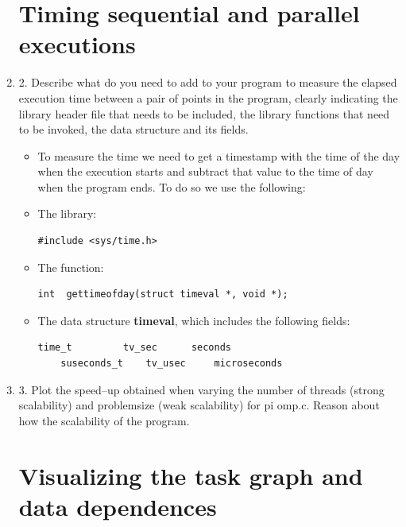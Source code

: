 \documentclass[12pt]{article}
\begin{document}
\begin{enumerate}
\section*{Timing sequential and parallel executions}

\item[] 2. Describe what do you need to add to your program to measure the elapsed execution time between a pair of points in the program, clearly indicating the library header file that needs to be included, the library functions that need to be invoked, the data structure and its fields.


\begin{itemize}

\item[] To measure the time we need to get a timestamp with the time of the day when the execution starts and subtract that value to the time of day when the program ends. To do so we use the following:

\item The library:
\begin{lstlisting}[style=CStyle]
	#include <sys/time.h>
\end{lstlisting}

\item The function:
\begin{lstlisting}[style=CStyle]
	int  gettimeofday(struct timeval *, void *);
\end{lstlisting}

\item The data structure \textbf{timeval}, which includes the following fields:

\begin{lstlisting}[style=CStyle]
	time_t         tv_sec      seconds
	suseconds_t    tv_usec     microseconds
\end{lstlisting}





\end{itemize}




\item[] 3. Plot the speed–up obtained when varying the number of threads (strong scalability) and problemsize (weak scalability) for pi omp.c. Reason about how the scalability of the program.






\section*{Visualizing the task graph and data dependences}



\end{enumerate}
\end{document}
